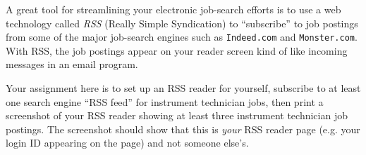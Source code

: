 

A great tool for streamlining your electronic job-search efforts is to use a web technology called {\it RSS} (Really Simple Syndication) to ``subscribe'' to job postings from some of the major job-search engines such as {\tt Indeed.com} and {\tt Monster.com}.  With RSS, the job postings appear on your reader screen kind of like incoming messages in an email program.

Your assignment here is to set up an RSS reader for yourself, subscribe to at least one search engine ``RSS feed'' for instrument technician jobs, then print a screenshot of your RSS reader showing at least three instrument technician job postings.  The screenshot should show that this is {\it your} RSS reader page (e.g. your login ID appearing on the page) and not someone else's.


















